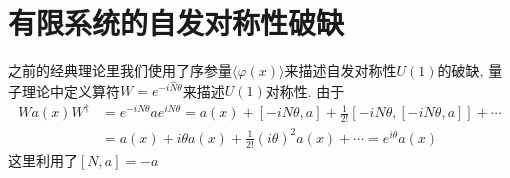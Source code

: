 \documentclass[a4paper,11pt]{article}
\begin{document}
\section{有限系统的自发对称性破缺}
之前的经典理论里我们使用了序参量$\langle\varphi(x)\rangle$来描述自发对称性$U(1)$的破缺, 量子理论中定义算符$W=e^{-i\hat{N}\theta}$来描述$U(1)$对称性. 由于
\begin{equation*}
  \begin{split}
     Wa(x)W^\dag&=e^{-iN\theta}ae^{iN\theta}=a(x)+[-iN\theta,a]+\frac{1}{2!}[-iN\theta,[-iN\theta,a]]+\cdots\\
       &=a(x)+i\theta a(x)+\frac{1}{2!}(i\theta)^2a(x)+\cdots=e^{i\theta}a(x)
  \end{split}
\end{equation*}
这里利用了$[N,a]=-a$
\end{document}

